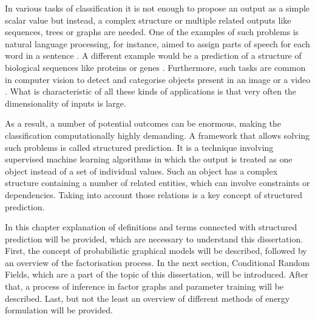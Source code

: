 In various tasks of classification it is not enough to propose an output as a simple scalar value but instead, a complex structure or multiple related outputs like sequences, trees or graphs are needed. One of the examples of such problems is natural language processing, for instance, aimed to assign parts of speech for each word in a sentence \cite{markov_altun}. A different example would be a prediction of a structure of biological sequences like proteins or genes \cite{graph_liu}. Furthermore, such tasks are common in computer vision to detect and categorise objects present in an image or a video \cite{crf_torralba}. What is characteristic of all these kinds of applications is that very often the dimensionality of inputs is large. 

As a result, a number of potential outcomes can be enormous, making the classification computationally highly demanding. A framework that allows solving such problems is called structured prediction. It is a technique involving supervised machine learning algorithms in which the output is treated as one object instead of a set of individual values. Such an object has a complex structure containing a number of related entities, which can involve constraints or dependencies. Taking into account those relations is a key concept of structured prediction. 

In this chapter explanation of definitions and terms connected with structured prediction will be provided, which are necessary to understand this dissertation. First, the concept of probabilistic graphical models will be described, followed by an overview of the factorisation process. In the next section, Conditional Random Fields, which are a part of the topic of this dissertation, will be introduced. After that, a process of inference in factor graphs and parameter training will be described. Last, but not the least an overview of different methods of energy formulation will be provided. 